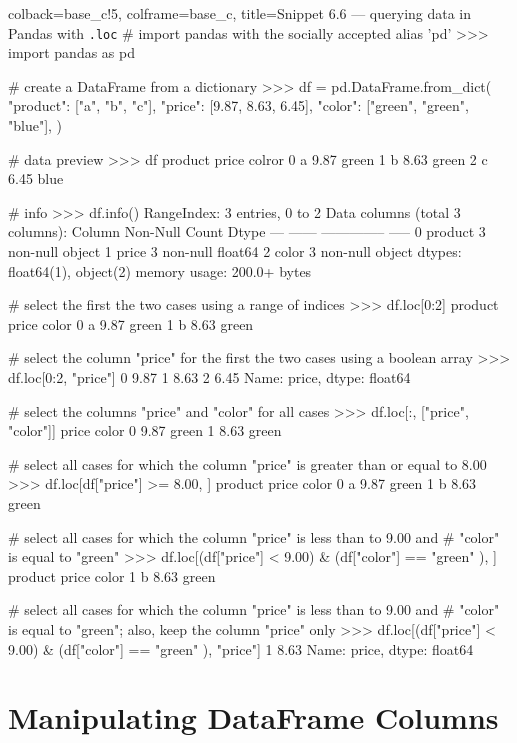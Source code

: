 \documentclass[a4paper,11pt]{book}
\numberwithin{figure}{chapter}
\numberwithin{table}{chapter}
\begin{document}
\begin{pythoncode}[linenos=True]{colback=base_c!5, colframe=base_c, title=\sffamily Snippet 6.6 --- querying data in Pandas with \texttt{.loc}}
# import pandas with the socially accepted alias 'pd'
>>> import pandas as pd

# create a DataFrame from a dictionary
>>> df = pd.DataFrame.from_dict(
        {
            "product": ["a", "b", "c"],
            "price": [9.87, 8.63, 6.45],
            "color": ["green", "green", "blue"],
        }
    )

# data preview
>>> df
  product  price colror
0       a   9.87  green
1       b   8.63  green
2       c   6.45   blue

# info 
>>> df.info()
RangeIndex: 3 entries, 0 to 2
Data columns (total 3 columns):
     Column   Non-Null Count  Dtype  
---  ------   --------------  -----  
 0   product  3 non-null      object 
 1   price    3 non-null      float64
 2   color   3 non-null      object 
dtypes: float64(1), object(2)
memory usage: 200.0+ bytes

# select the first the two cases using a range of indices
>>> df.loc[0:2]
      product  price  color
    0       a   9.87  green
    1       b   8.63  green

# select the column "price" for the first the two cases using a boolean array
>>> df.loc[0:2, "price"]
0    9.87
1    8.63
2    6.45
Name: price, dtype: float64

# select the columns "price" and "color" for all cases
>>> df.loc[:, ["price", "color"]]
   price  color
0   9.87  green
1   8.63  green

# select all cases for which the column "price" is greater than or equal to 8.00
>>> df.loc[df["price"] >= 8.00, ]
  product  price  color
0       a   9.87  green
1       b   8.63  green

# select all cases for which the column "price" is less than to 9.00 and 
# "color" is equal to "green"
>>> df.loc[(df["price"] < 9.00) & (df["color"] == "green" ), ]
  product  price  color
1       b   8.63  green

# select all cases for which the column "price" is less than to 9.00 and 
# "color" is equal to "green"; also, keep the column "price" only
>>> df.loc[(df["price"] < 9.00) & (df["color"] == "green" ), "price"]
1    8.63
Name: price, dtype: float64
\end{pythoncode}
\clearpage

\section{Manipulating DataFrame Columns}
\label{sec:manipulating_df_columns}
\end{document}
